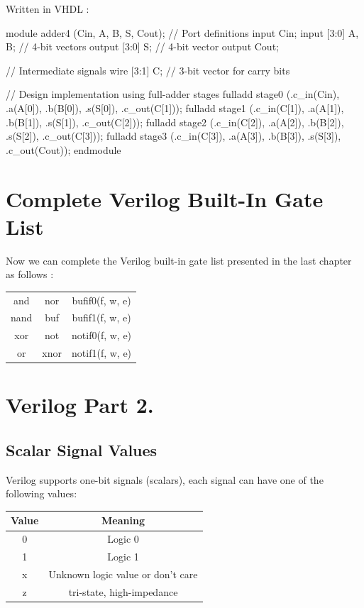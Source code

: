 \documentclass[12pt,openany]{book}
\begin{document}
			      	Written in VHDL : 
			      	\begin{vhdl}
module adder4 (Cin, A, B, S, Cout);
// Port definitions
input Cin;
input [3:0] A, B; // 4-bit vectors
output [3:0] S;   // 4-bit vector
output Cout;

// Intermediate signals
wire [3:1] C; // 3-bit vector for carry bits

// Design implementation using full-adder stages
fulladd stage0 (.c_in(Cin), .a(A[0]), .b(B[0]), .s(S[0]), .c_out(C[1]));
fulladd stage1 (.c_in(C[1]), .a(A[1]), .b(B[1]), .s(S[1]), .c_out(C[2]));
fulladd stage2 (.c_in(C[2]), .a(A[2]), .b(B[2]), .s(S[2]), .c_out(C[3]));
fulladd stage3 (.c_in(C[3]), .a(A[3]), .b(B[3]), .s(S[3]), .c_out(Cout));
endmodule
			      	\end{vhdl}
			      	
			      	
					
			      	

					
\section{Complete Verilog Built-In Gate List}
Now we can complete the Verilog built-in gate list presented in the last chapter as follows :
\begin{center}
	\begin{tabular}{c|c|c}
		and  & nor & bufif0(f, w, e)  \\
		nand & buf & bufif1(f, w, e)  \\
		xor  & not & notif0(f, w, e) \\
		or   & xnor & notif1(f, w, e) \\
	\end{tabular}

\end{center}



\section{Verilog Part 2.}

\subsection{Scalar Signal Values}
Verilog supports one-bit signals (scalars), each signal can have one of the following values:
\begin{center}
	\begin{tabular}{cc}
	\hline
	Value & Meaning \\
	\hline
	0 & Logic 0 \\
	1 & Logic 1 \\
	x & Unknown logic value or don't care \\
	z & tri-state, high-impedance \\
	\hline
\end{tabular}
\end{center}
\end{document}
